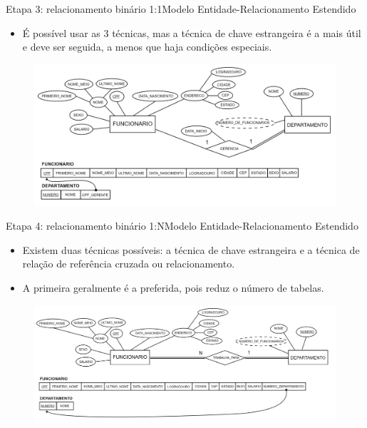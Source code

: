 \documentclass[t]{beamer}
\begin{document}

\begin{ftst}{Etapa 3: relacionamento binário 1:1}{Modelo Entidade-Relacionamento Estendido}
\begin{itemize}
    \item É possível usar as 3 técnicas, mas a técnica de chave estrangeira é a mais útil e deve ser seguida, a menos que haja condições especiais.
\end{itemize}

\begin{figure}
    \centering
    \includegraphics[scale=0.12]{Figuras/03_05.png}
\end{figure}
\end{ftst}


\begin{ftst}{Etapa 4: relacionamento binário 1:N}{Modelo Entidade-Relacionamento Estendido}
\small
\begin{itemize}
    \item Existem duas técnicas possíveis: a técnica de chave estrangeira e a técnica de relação de referência cruzada ou relacionamento. 
    \item A primeira geralmente é a preferida, pois reduz o número de tabelas.
\end{itemize}
\begin{figure}
    \centering
    \includegraphics[scale=0.1]{Figuras/03_09.png}
\end{figure}
\end{ftst}
\end{document}

